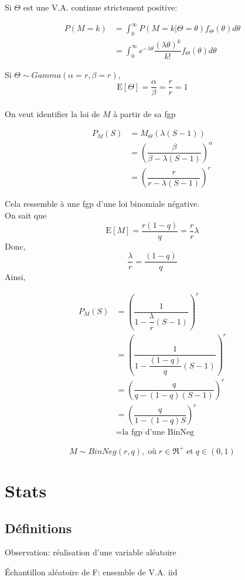 \documentclass[]{book}
\theoremstyle{definition}
\theoremstyle{definition}
\theoremstyle{definition}
\theoremstyle{remark}
\begin{document}
Si \(\Theta\) est une V.A. continue strictement positive:

\begin{align*}
P(M=k)& = \int^\infty_0 P(M=k|\Theta=\theta)f_\Theta(\theta)d\theta\\
& =\int_0^\infty e^{-\lambda \theta} \dfrac{(\lambda\theta)^k}{k!}f_\Theta(\theta)d\theta
\end{align*}

Si \(\Theta \sim Gamma(\alpha=r,\beta=r)\), \[
\text{E}[\Theta]=\dfrac{\alpha}{\beta}=\dfrac{r}{r}=1
\]\\
On veut identifier la loi de \(M\) à partir de sa fgp

\begin{align*}
P_M(S)& =M_\Theta\left (\lambda(S-1)\right )\\
& =\left (\dfrac{\beta}{\beta-\lambda(S-1)}\right )^\alpha\\
& =\left (\dfrac{r}{r-\lambda(S-1)}\right )^r
\end{align*}

Cela ressemble à une fgp d'une loi binomiale négative.\\
On sait que \[
\text{E}[M]=\dfrac{r(1-q)}{q}=\dfrac{r}{r}\lambda
\] Donc, \[
\dfrac{\lambda}{r}=\dfrac{(1-q)}{q}
\] Ainsi,

\begin{align*}
P_M(S)& =\left (\dfrac{1}{1-\dfrac{\lambda}{r}(S-1)}\right )^r\\
& =\left (\dfrac{1}{1-\dfrac{(1-q)}{q}(S-1)}\right )^r\\
& =\left (\dfrac{q}{q-(1-q)(S-1)}\right )^r\\
& =\left (\dfrac{q}{1-(1-q)S}\right )^r\\
& =\text{la fgp d'une BinNeg}
\end{align*}

\[
M \sim BinNeg(r,q),\;\text{où}\;r \in \Re^+\;\text{et}\; q \in (0,1)
\]

\chapter{Stats}\label{stats}

\section{Définitions}\label{definitions}

Observation: réalisation d'une variable aléatoire

Échantillon aléatoire de F: ensemble de V.A. iid
\end{document}
